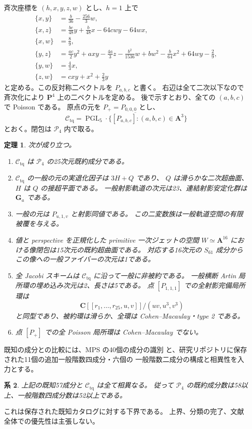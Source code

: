 \documentclass[11pt,a4paper]{ltjsarticle}
\newcommand{\CC}{\mathbf C}
\newcommand{\PP}{\mathbf P}
\renewcommand{\AA}{\mathbf A}
\newcommand{\GG}{\mathbf G}
\newcommand{\cP}{\mathcal P_4}
\newcommand{\cC}{\mathcal C_{\mathrm{tq}}}
\DeclareMathOperator{\PGL}{PGL}
\newtheorem{theorem}{定理}[section]
\newtheorem{corollary}[theorem]{系}
\theoremstyle{remark}
\begin{document}
斉次座標を $(h,x,y,z,w)$ とし、$h=1$ 上で
\begin{equation}\label{eq:family}
\begin{aligned}
 \{x,y\}&=\frac b{36}-\frac{256}3w,\\
 \{x,z\}&=\frac{bc}{48}y+\frac b{48}x-64cwy-64wx,\\
 \{x,w\}&=\frac89,\\
 \{y,z\}&=\frac{ac}{2}y^2+axy-\frac{4a}{3}z
 -\frac{b^2}{1536}w+bw^2-\frac b{64}x^2+64wy-\frac29,\\
 \{y,w\}&=\frac43x,\\
 \{z,w\}&=cxy+x^2+\frac23y
\end{aligned}
\end{equation}
と定める。この反対称二ベクトルを $P_{a,b,c}$ と書く。
右辺は全て二次以下なので斉次化により $\PP^4$ 上の二ベクトルを定める。
後で示すとおり、全ての $(a,b,c)$ で Poisson である。
原点の元を $P_+=P_{0,0,0}$ とし、
\[
 \cC=\overline{\PGL_5\cdot
       \{[P_{a,b,c}]:(a,b,c)\in\AA^3\}}
\]
とおく。閉包は $\cP$ 内で取る。

\begin{theorem}\label{thm:main}
次が成り立つ。
\begin{enumerate}
\item $\cC$ は $\cP$ の25次元既約成分である。
\item $\cC$ の一般の元の実退化因子は $3H+Q$ であり、
 $Q$ は滑らかな二次超曲面、$H$ は $Q$ の接超平面である。
 一般射影軌道の次元は23、連結射影安定化群は $\GG_a$ である。
\item 一般の元は $P_{u,1,v}$ と射影同値である。
 この二変数族は一般軌道空間の有限被覆を与える。
\item 値と perspective を正規化した primitive 一次ジェットの空間
 $W\simeq\AA^{16}$ における像閉包は15次元の既約超曲面である。
 対応する16次元の $S_{61}$ 成分からこの像への一般ファイバーの次元は1である。
\item 全 Jacobi スキームは $\cC$ に沿って一般に非被約である。
 一般横断 Artin 局所環の埋め込み次元は2、長さは5である。
 点 $[P_{1,1,1}]$ での全射影完備局所環は
 \[
 \CC[[r_1,\ldots,r_{25},u,v]]/(uv,u^3,v^3)
 \]
 と同型であり、被約環は滑らか、全環は Cohen--Macaulay・type 2 である。
\item 点 $[P_+]$ での全 Poisson 局所環は Cohen--Macaulay でない。
\end{enumerate}
\end{theorem}

既知の成分との比較には、MPS の40個の成分の識別
\cite{mps} と、研究リポジトリに保存された11個の追加一般階数四成分・六個の
一般階数二成分の構成と相異性を入力とする。
\begin{corollary}\label{cor:58}
上記の既知57成分と $\cC$ は全て相異なる。
従って $\cP$ の既約成分数は58以上、一般階数四成分数は52以上である。
\end{corollary}
これは保存された既知カタログに対する下界である。
上界、分類の完了、文献全体での優先性は主張しない。
\end{document}
